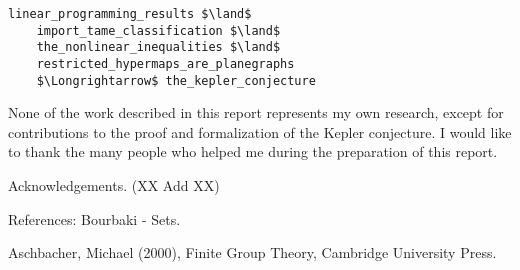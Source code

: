 \documentclass[brochure,english,12pt]{bourbaki}
\theoremstyle{plain}
\begin{document}
\begin{lstlisting}[keepspaces=true,stringstyle=\tt,basicstyle=\small,frame=single,framesep=8pt,framextopmargin=10pt,mathescape,morekeywords={Variable,Theorem,Proof,Qed},columns=flexible,caption={The formal proof of the Kepler conjecture in HOL Light}]
    linear_programming_results $\land$      
    import_tame_classification $\land$      
    the_nonlinear_inequalities $\land$
    restricted_hypermaps_are_planegraphs    
    $\Longrightarrow$ the_kepler_conjecture
\end{lstlisting}


None of the work described in this report represents my own research, except for contributions to the
proof and formalization of the Kepler conjecture.  I would like to thank the many people who helped me
during the preparation of this report.

Acknowledgements.  (XX Add XX)


\raggedright



References: Bourbaki - Sets.

Aschbacher, Michael (2000), Finite Group Theory, Cambridge University Press.
\end{document}
